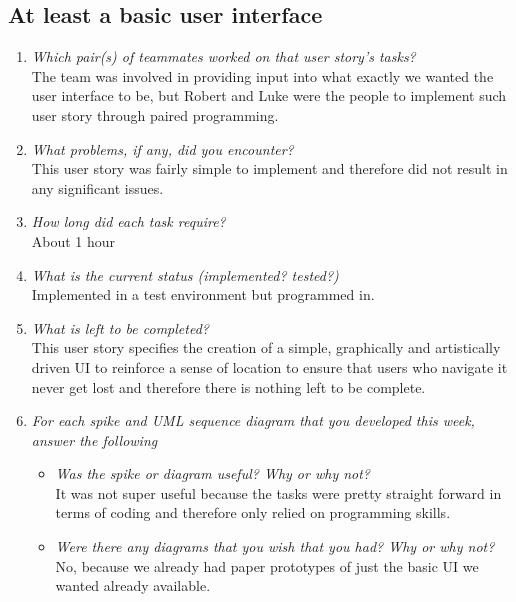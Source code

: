 \documentclass[12pt, letterpaper]{article}
\begin{document}
\subsection{At least a basic user interface}
\begin{enumerate}
	\item \emph{Which pair(s) of teammates worked on that user story's tasks?}
	\\The team was involved in providing input into what exactly we wanted the user interface to be, but Robert and Luke were the people to implement such user story through paired programming.
	\item \emph{What problems, if any, did you encounter?}
	\\This user story was fairly simple to implement and therefore did not result in any significant issues.
	\item \emph{How long did each task require?}
	\\About 1 hour
	\item \emph{What is the current status (implemented? tested?)}
	\\Implemented in a test environment but programmed in.
	\item \emph{What is left to be completed?}
	\\This user story specifies the creation of a simple, graphically and artistically driven UI to reinforce a sense of location to ensure that users who navigate it never get lost and therefore there is nothing left to be complete.
	\item \emph{For each spike and UML sequence diagram that you developed this week, answer the following}
	\begin{itemize}
		\item \emph{Was the spike or diagram useful? Why or why not?}
		\\It was not super useful because the tasks were pretty straight forward in terms of coding and therefore only relied on programming skills.
		\item \emph{Were there any diagrams that you wish that you had? Why or why not?}
		\\No, because we already had paper prototypes of just the basic UI we wanted already available.
	\end{itemize}
\end{enumerate}
\end{document}
